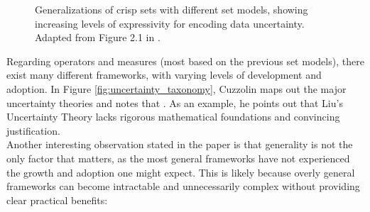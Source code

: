 \begin{figure}[ht]
    \caption{Generalizations of crisp sets with different set models, showing increasing levels of expressivity for encoding data uncertainty. Adapted from Figure 2.1 in \cite{UncertaintySciences}.}
    \label{fig:Generalized_sets}
\end{figure}



Regarding operators and measures (most based on the previous set models), there exist many different frameworks, with varying levels of development and adoption. In Figure \ref{fig:uncertainty_taxonomy}, Cuzzolin \cite{uncertaintymeasuresbigpicture} maps out the major uncertainty theories and notes that . As an example, he points out that Liu's Uncertainty Theory lacks rigorous mathematical foundations and convincing justification. \\

Another interesting observation stated in the paper is that generality is not the only factor that matters, as the most general frameworks have not experienced the growth and adoption one might expect. This is likely because overly general frameworks can become intractable and unnecessarily complex without providing clear practical benefits:

